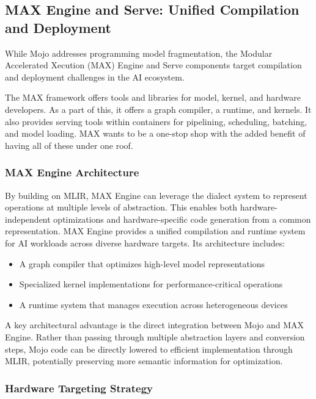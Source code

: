 \documentclass[manuscript,screen,review,format=acmsmall]{acmart}
\begin{document}
\subsection{MAX Engine and Serve: Unified Compilation and Deployment}

While Mojo addresses programming model fragmentation, the Modular Accelerated Xecution (MAX) Engine and Serve components target compilation and deployment challenges in the AI ecosystem.

The MAX framework offers tools and libraries for model, kernel, and hardware developers. As a part of this, it offers a graph compiler, a runtime, and kernels. It also provides serving tools within containers for pipelining, scheduling, batching, and model loading. MAX wants to be a one-stop shop with the added benefit of having all of these under one roof.

\subsubsection{MAX Engine Architecture}

By building on MLIR, MAX Engine can leverage the dialect system to represent operations at multiple levels of abstraction. This enables both hardware-independent optimizations and hardware-specific code generation from a common representation. MAX Engine provides a unified compilation and runtime system for AI workloads across diverse hardware targets. Its architecture includes:

\begin{itemize}
    \item A graph compiler that optimizes high-level model representations
    \item Specialized kernel implementations for performance-critical operations
    \item A runtime system that manages execution across heterogeneous devices
\end{itemize}

A key architectural advantage is the direct integration between Mojo and MAX Engine. Rather than passing through multiple abstraction layers and conversion steps, Mojo code can be directly lowered to efficient implementation through MLIR, potentially preserving more semantic information for optimization.

\subsubsection{Hardware Targeting Strategy}
\end{document}
